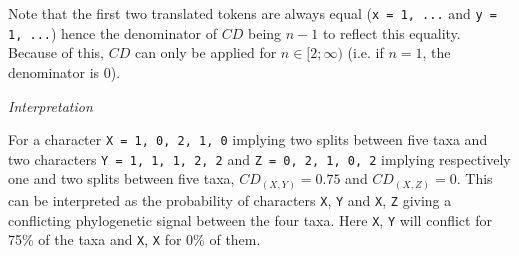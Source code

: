 \documentclass[12pt,letterpaper]{article}
\renewcommand{\subsection}[1]{%
\bigskip
\begin{center}
\begin{large}
\normalfont\itshape #1
\end{large}
\end{center}}
\begin{document}
Note that the first two translated tokens are always equal (\texttt{x = {1, ...}} and \texttt{y = {1, ...}}) hence the denominator of $CD$ being $n - 1$ to reflect this equality.
Because of this, $CD$ can only be applied for $n \in [2;\infty)$ (i.e. if $n = 1$, the denominator is 0).

\subsection{Interpretation}
For a character \texttt{X = {1, 0, 2, 1, 0}} implying two splits between five taxa and two characters \texttt{Y = {1, 1, 1, 2, 2}} and \texttt{Z = {0, 2, 1, 0, 2}} implying respectively one and two splits between five taxa, $CD_{(X,Y)} = 0.75$ and $CD_{(X,Z)} = 0$.
This can be interpreted as the probability of characters \texttt{X}, \texttt{Y} and \texttt{X}, \texttt{Z} giving a conflicting phylogenetic signal between the four taxa.
Here \texttt{X}, \texttt{Y} will conflict for 75\% of the taxa and \texttt{X}, \texttt{X} for 0\% of them.



\end{document}
